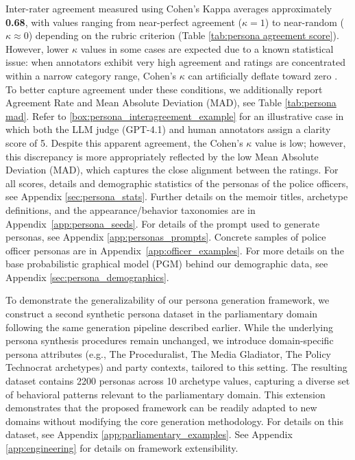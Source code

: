 \documentclass[11pt]{article}
\begin{document}
Inter-rater agreement measured using Cohen’s Kappa \citep{cohen_kappa_original} averages approximately \textbf{0.68}, with values ranging from near-perfect agreement ($\kappa = 1$) to near-random ($\kappa \approx 0$) depending on the rubric criterion (Table \ref{tab:persona agreement score}). However, lower $\kappa$ values in some cases are expected due to a known statistical issue: when annotators exhibit very high agreement and ratings are concentrated within a narrow category range, Cohen’s $\kappa$ can artificially deflate toward zero \citep{high_agreement_low_kappa}.
To better capture agreement under these conditions, we additionally report Agreement Rate and Mean Absolute Deviation (MAD), see Table \ref{tab:persona mad}. Refer to \ref{box:persona_interagreement_example} for an illustrative case in which both the LLM judge (GPT-4.1) and human annotators assign a clarity score of 5. Despite this apparent agreement, the Cohen’s $\kappa$ value is low; however, this discrepancy is more appropriately reflected by the low Mean Absolute Deviation (MAD), which captures the close alignment between the ratings. For all scores, details and demographic statistics of the personas of the police officers, see Appendix \ref{sec:persona_stats}. Further details on the memoir titles, archetype definitions, and the appearance/behavior taxonomies are in Appendix~\ref{app:persona_seeds}. For details of the prompt used to generate personas, see Appendix \ref{app:personas_prompts}. Concrete samples of police officer personas are in Appendix~\ref{app:officer_examples}. 
For more details on the base probabilistic graphical model (PGM) behind our demographic data, see Appendix \ref{sec:persona_demographics}. 

To demonstrate the generalizability of our persona generation framework, we construct a second synthetic persona dataset in the parliamentary domain following the same generation pipeline described earlier. While the underlying persona synthesis procedures remain unchanged, we introduce domain-specific persona attributes (e.g., The Proceduralist, The Media Gladiator, The Policy Technocrat archetypes) and party contexts,  tailored to this setting. The resulting dataset contains 2200 personas across 10 archetype values, capturing a diverse set of behavioral patterns relevant to the parliamentary domain. This extension demonstrates that the proposed framework can be readily adapted to new domains without modifying the core generation methodology. For details on this dataset, see Appendix \ref{app:parliamentary_examples}. See Appendix \ref{app:engineering} for details on framework extensibility.
\end{document}
